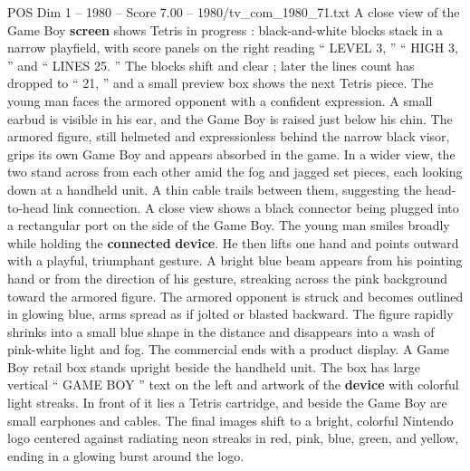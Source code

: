 \begin{textsample}{POS Dim 1 – 1980 – Score 7.00 – 1980/tv\_com\_1980\_71.txt}
A close view of the Game Boy \textbf{screen} shows Tetris in progress : black-and-white blocks stack in a narrow playfield, with score panels on the right reading “ LEVEL 3, ” “ HIGH 3, ” and “ LINES 25. ” The blocks shift and clear ; later the lines count has dropped to “ 21, ” and a small preview box shows the next Tetris piece.
The young man faces the armored opponent with a confident expression.
A small earbud is visible in his ear, and the Game Boy is raised just below his chin.
The armored figure, still helmeted and expressionless behind the narrow black visor, grips its own Game Boy and appears absorbed in the game.
In a wider view, the two stand across from each other amid the fog and jagged set pieces, each looking down at a handheld unit.
A thin cable trails between them, suggesting the head-to-head link connection.
A close view shows a black connector being plugged into a rectangular port on the side of the Game Boy.
The young man smiles broadly while holding the \textbf{connected} \textbf{device}.
He then lifts one hand and points outward with a playful, triumphant gesture.
A bright blue beam appears from his pointing hand or from the direction of his gesture, streaking across the pink background toward the armored figure.
The armored opponent is struck and becomes outlined in glowing blue, arms spread as if jolted or blasted backward.
The figure rapidly shrinks into a small blue shape in the distance and disappears into a wash of pink-white light and fog.
The commercial ends with a product display.
A Game Boy retail box stands upright beside the handheld unit.
The box has large vertical “ GAME BOY ” text on the left and artwork of the \textbf{device} with colorful light streaks.
In front of it lies a Tetris cartridge, and beside the Game Boy are small earphones and cables.
The final images shift to a bright, colorful Nintendo logo centered against radiating neon streaks in red, pink, blue, green, and yellow, ending in a glowing burst around the logo.

\end{textsample}

